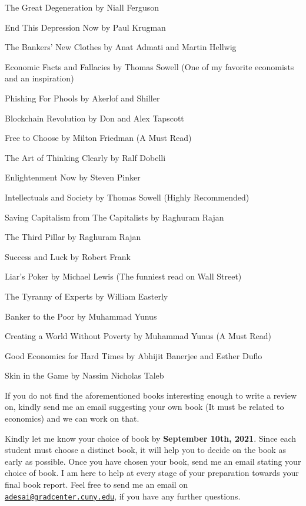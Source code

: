 \documentclass[
]{article}
\begin{document}
The Great Degeneration by Niall Ferguson

End This Depression Now by Paul Krugman

The Bankers' New Clothes by Anat Admati and Martin Hellwig

Economic Facts and Fallacies by Thomas Sowell (One of my favorite
economists and an inspiration)

Phishing For Phools by Akerlof and Shiller

Blockchain Revolution by Don and Alex Tapscott

Free to Choose by Milton Friedman (A Must Read)

The Art of Thinking Clearly by Ralf Dobelli

Enlightenment Now by Steven Pinker

Intellectuals and Society by Thomas Sowell (Highly Recommended)

Saving Capitalism from The Capitalists by Raghuram Rajan

The Third Pillar by Raghuram Rajan

Success and Luck by Robert Frank

Liar's Poker by Michael Lewis (The funniest read on Wall Street)

The Tyranny of Experts by William Easterly

Banker to the Poor by Muhammad Yunus

Creating a World Without Poverty by Muhammad Yunus (A Must Read)

Good Economics for Hard Times by Abhijit Banerjee and Esther Duflo

Skin in the Game by Nassim Nicholas Taleb

If you do not find the aforementioned books interesting enough to write
a review on, kindly send me an email suggesting your own book (It must
be related to economics) and we can work on that.

Kindly let me know your choice of book by \textbf{September 10th, 2021}.
Since each student must choose a distinct book, it will help you to
decide on the book as early as possible. Once you have chosen your book,
send me an email stating your choice of book. I am here to help at every
stage of your preparation towards your final book report. Feel free to
send me an email on
\href{mailto:adesai@gradcenter.cuny.edu}{\nolinkurl{adesai@gradcenter.cuny.edu}},
if you have any further questions.
\end{document}
